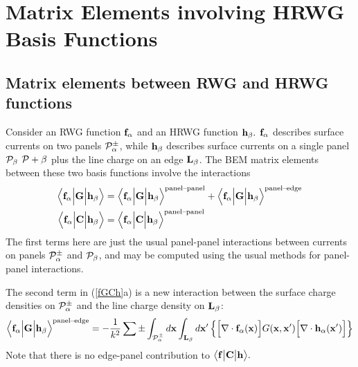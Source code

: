 \documentclass[letterpaper]{article}
\begin{document}
\newpage
\section{Matrix Elements involving HRWG Basis Functions}

\subsection{Matrix elements between RWG and HRWG functions}

Consider an RWG function $\mathbf{f}_\alpha$ and an HRWG function
$\mathbf{h}_\beta.$ $\mathbf{f}_\alpha$ describes surface currents 
on two panels $\mathcal{P}_\alpha^\pm$, while $\mathbf{h}_\beta$ describes
surface currents on a single panel $\mathcal{P}_\beta$
$\mathcal{P}+\beta$ plus the line charge on an edge $\mathbf{L}_\beta$.
The BEM matrix elements between these two basis functions
involve the interactions
\begin{subequations}
\begin{align}
  \Big\langle \mathbf{f}_\alpha \Big| \mathbf{G} \Big| \mathbf{h}_\beta \Big\rangle
&=
  \Big\langle \mathbf{f}_\alpha \Big| \mathbf{G} \Big| \mathbf{h}_\beta \Big\rangle^{\hbox{\scriptsize{panel--panel}}}
+
  \Big\langle \mathbf{f}_\alpha \Big| \mathbf{G} \Big| \mathbf{h}_\beta \Big\rangle^{\hbox{\scriptsize{panel--edge}}}
\\
  \Big\langle \mathbf{f}_\alpha \Big| \mathbf{C} \Big| \mathbf{h}_\beta \Big\rangle
&=
  \Big\langle \mathbf{f}_\alpha \Big| \mathbf{C} \Big| \mathbf{h}_\beta \Big\rangle^{\hbox{\scriptsize{panel--panel}}}
\end{align}
\label{fGCh}
\end{subequations}
The first terms here are just the usual panel-panel
interactions between currents on panels $\mathcal{P}_{\alpha}^\pm$ 
and $\mathcal{P}_\beta$, and may be computed using the usual
\lss methods for panel-panel interactions. 

The second term in (\ref{fGCh}a) is a new interaction
between the surface charge densities on $\mathcal{P}_{\alpha}^\pm$ 
and the line charge density on $\mathbf{L}_\beta$:
\begin{align*}
  \Big\langle \mathbf{f}_\alpha \Big| \mathbf{G} \Big| \mathbf{h}_\beta \Big\rangle^{\hbox{\scriptsize{panel--edge}}}
=
-\frac{1}{k^2}
   \sum \pm
   \int_{\mathcal{P}_\alpha^\pm} d\mathbf{x}
   \int_{\mathbf{L}_\beta} d\mathbf{x}^\prime
   \left\{ \Big[\nabla \cdot \mathbf{f}_\alpha(\mathbf{x})\Big]
           G(\mathbf{x}, \mathbf{x}^\prime)
           \Big[\nabla \cdot \mathbf{h}_\alpha(\mathbf{x}^\prime)\Big]
   \right\}
\end{align*}
Note that there is no edge-panel contribution to 
$\big\langle \mathbf{f} \big| \mathbf{C} \big| \mathbf{h} \big\rangle.$
\end{document}
